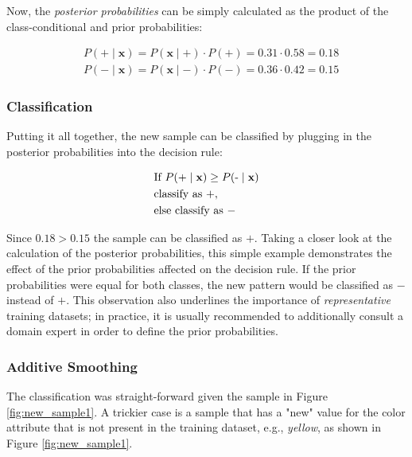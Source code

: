 \documentclass{article}
\begin{document}
Now,  the \emph{posterior probabilities} can be simply calculated as the product of the class-conditional and prior probabilities:

\begin{equation} 
\begin{split}
& P(+ \mid \textbf{x}) = P(\textbf{x} \mid +) \cdot P(+) = 0.31  \cdot  0.58 = 0.18  \\
& P(- \mid \textbf{x}) = P(\textbf{x} \mid -) \cdot P(-) = 0.36  \cdot  0.42 = 0.15
\end{split}
\end{equation} 


\subsubsection{Classification}

Putting it all together, the new sample can be classified by plugging in the posterior probabilities into the decision rule:

\begin{equation} 
\begin{split}
&\text{If } P(+ \mid \textbf x) \geq P(\text{-} \mid \textbf{x})  \\
&\text{classify as }+, \\
& \text{else } \text{classify as } -
\end{split}
\end{equation} 

Since $0.18 > 0.15$  the sample can be classified as $+$. Taking a closer look at the calculation of the posterior probabilities, this simple example demonstrates the effect of the prior probabilities affected on the decision rule. If the prior probabilities were equal for both classes, the new pattern would be classified as $-$ instead of $+$. This observation also underlines the importance of \emph{representative} training datasets; in practice, it is usually recommended to additionally consult a domain expert in order to define the prior probabilities.

\subsubsection{Additive Smoothing}
\label{sec:additive_smoothing}

The classification was straight-forward given the sample in Figure \ref{fig:new_sample1}. A trickier case is a sample that has a "new" value for the color attribute that is not present in the training dataset, e.g., \emph{yellow}, as shown in Figure \ref{fig:new_sample1}.
\end{document}
